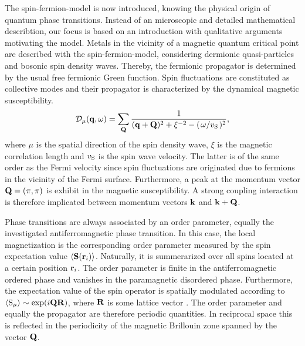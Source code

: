 The spin-fermion-model is now introduced, knowing the physical origin of quantum phase transitions.
Instead of an microscopic and detailed mathematical describtion, our focus is based on an introduction with qualitative arguments motivating the model.
Metals in the vicinity of a magnetic quantum critical point are described with the spin-fermion-model, considering dermionic quasi-particles and bosonic spin density waves.
Thereby, the fermionic propagator is determined by the usual free fermionic Green function.
Spin fluctuations are constituted as collective modes and their propagator is characterized by the dynamical magnetic susceptibility.
%
\begin{align}
	\mathcal{D}_{\mu}(\vb{q}, \omega) = \sum\limits_{\vb{Q}} \frac{1}{(\vb{q}+\vb{Q})^{2} + \xi^{-2} - (\flatfrac{\omega}{v_{\mt{S}}})^{2}},
	\label{eq:undamped spin propagator}
\end{align}
%
where $\mu$ is the spatial direction of the spin density wave, $\xi$ is the magnetic correlation length and $v_{\mathrm{S}}$ is the spin wave velocity.
The latter is of the same order as the Fermi velocity since spin fluctuations are originated due to fermions in the vicinity of the Fermi surface.
Furthermore, a peak at the momentum vector $\vb{Q} = (\pi, \pi)$ is exhibit in the magnetic susceptibility.
A strong coupling interaction is therefore implicated between momentum vectors $\vb{k}$ and $\vb{k} + \vb{Q}$.

Phase transitions are always associated by an order parameter, equally the investigated antiferromagnetic phase transition.
In this case, the local magnetization is the corresponding order parameter measured by the spin expectation value $\expval{\vb{S}(\vb{r}_{i})}$.
Naturally, it is summerarized over all spins located at a certain position $\vb{r}_{i}$.
The order parameter is finite in the antiferromagnetic ordered phase and vanishes in the paramagnetic disordered phase.
Furthermore, the expectation value of the spin operator is spatially modulated according to $\expval{\mathrm{S}_{\mu}} \sim \exp({i\vb{Q}\vb{R}})$, where $\vb{R}$ is some lattice vector \cite{Weiss}. 
The order parameter and equally the propagator are therefore periodic quantities.
In reciprocal space this is reflected in the periodicity of the magnetic Brillouin zone spanned by the vector $\vb{Q}$.

